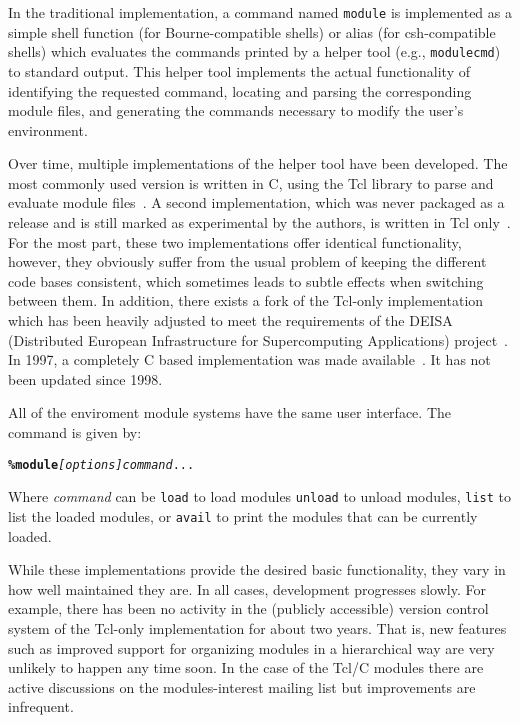 In the traditional implementation, a command named \texttt{module}
is implemented as a simple shell function (for Bourne-compatible shells) or
alias (for csh-compatible shells) which evaluates the commands printed by a
helper tool (e.g., \texttt{modulecmd}) to standard output. This helper tool
implements the actual functionality of identifying the requested command,
locating and parsing the corresponding module files, and generating the
commands necessary to modify the user's environment.

Over time, multiple implementations of the helper tool
have been developed. The most commonly used version is written in C, using the Tcl
library to parse and evaluate module files~\cite{em}. A second implementation, which
was never packaged as a release and is still marked as experimental by the
authors, is written in Tcl only~\cite{em}. For the most part, these two implementations
offer identical functionality, however, they obviously suffer from the usual
problem of keeping the different code bases consistent, which sometimes leads
to subtle effects when switching between them. In addition, there exists a
fork of the Tcl-only implementation which has been heavily adjusted to meet
the requirements of the DEISA (Distributed European Infrastructure for
Supercomputing Applications) project~\cite{wikiDEISA}.  In
1997, a completely C based implementation was made
available~\cite{cmod}.  It has not been updated since 1998.

All of the enviroment module systems have the same user interface.
The command is given by:
{\small
\begin{alltt}
    \textbf{\% module} \emph{[options]} \emph{command} ...
\end{alltt}
}
\noindent
Where \emph{command} can be \texttt{load} to load modules \texttt{unload}
to unload modules, \texttt{list} to list the loaded modules, or
\texttt{avail} to print the modules that can be currently loaded.



While these implementations provide the desired basic functionality, they
vary in how well maintained they are. In all cases, development
progresses slowly. For example, there has been no activity in the
(publicly accessible) version control system of the Tcl-only
implementation for about two years. That is, new features such as
improved support for organizing modules in a hierarchical way are very
unlikely to happen any time soon. In the case of the Tcl/C modules
there are active discussions on the modules-interest mailing list but
improvements are infrequent.

